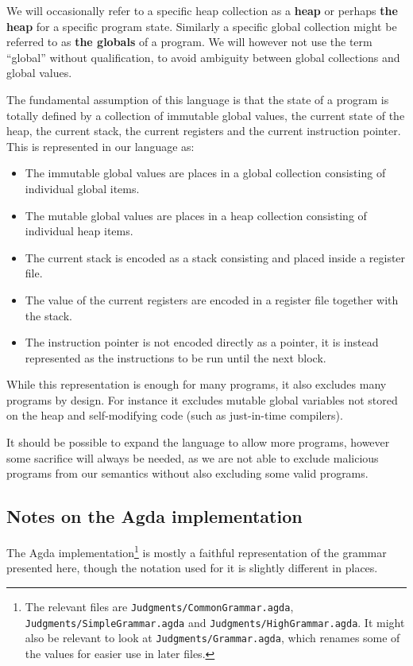 We will occasionally refer to a specific heap collection as a \textbf{heap} or
perhaps \textbf{the heap} for a specific program state. Similarly a specific
global collection might be referred to as \textbf{the globals} of a program. We
will however not use the term ``global'' without qualification, to avoid
ambiguity between global collections and global values.

The fundamental assumption of this language is that the state of a program is
totally defined by a collection of immutable global values, the current state of
the heap, the current stack, the current registers and the current instruction
pointer. This is represented in our language as:

\begin{itemize}
\item The immutable global values are places in a global collection
  consisting of individual global items.
\item The mutable global values are places in a heap collection
  consisting of individual heap items.
\item The current stack is encoded as a stack consisting and placed inside a
  register file.
\item The value of the current registers are encoded in a register file together
  with the stack.
\item The instruction pointer is not encoded directly as a pointer, it is
  instead represented as the instructions to be run until the next block.
\end{itemize}

While this representation is enough for many programs, it also excludes many
programs by design. For instance it excludes mutable global variables not stored
on the heap and self-modifying code (such as just-in-time compilers).

It should be possible to expand the language to allow more programs, however
some sacrifice will always be needed, as we are not able to exclude malicious
programs from our semantics without also excluding some valid programs.

\subsection{Notes on the Agda implementation}

The Agda implementation\footnote{The relevant files are
  \texttt{Judgments/CommonGrammar.agda}, \texttt{Judgments/SimpleGrammar.agda}
  and \texttt{Judgments/HighGrammar.agda}. It might also be relevant to look at
  \texttt{Judgments/Grammar.agda}, which renames some of the values for easier
  use in later files.} is mostly a faithful representation of the grammar
presented here, though the notation used for it is slightly different in places.

